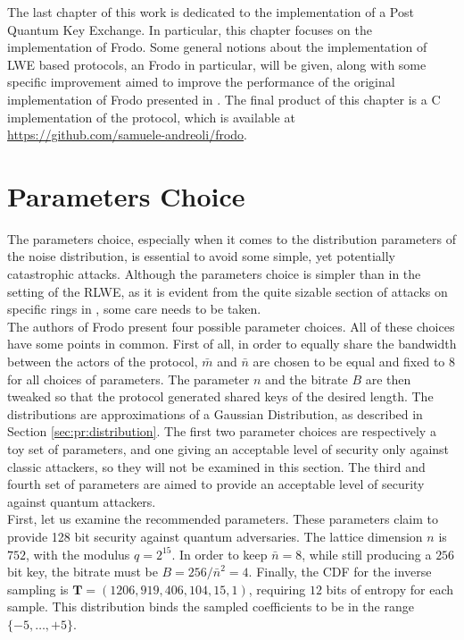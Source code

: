 The last chapter of this work is dedicated to the implementation of a Post Quantum Key Exchange. In particular, this chapter focuses on the implementation of Frodo. Some general notions about the implementation of LWE based protocols, an Frodo in particular, will be given, along with some specific improvement aimed to improve the performance of the original implementation of Frodo presented in \cite{frodo}. The final product of this chapter is a C implementation of the protocol, which is available at \url{https://github.com/samuele-andreoli/frodo}.

\section{Parameters Choice}
The parameters choice, especially when it comes to the distribution parameters of the noise distribution, is essential to avoid some simple, yet potentially catastrophic attacks. Although the parameters choice is simpler than in the setting of the RLWE, as it is evident from the quite sizable section of attacks on specific rings in \cite{RLWE_attacks}, some care needs to be taken.\\
The authors of Frodo present four possible parameter choices. All of these choices have some points in common. First of all, in order to equally share the bandwidth between the actors of the protocol, $\bar{m}$ and $\bar{n}$ are chosen to be equal and fixed to $8$ for all choices of parameters. The parameter $n$ and the bitrate $B$ are then tweaked so that the protocol generated shared keys of the desired length. The distributions are approximations of a Gaussian Distribution, as described in Section \ref{sec:pr:distribution}. The first two parameter choices are respectively a toy set of parameters, and one giving an acceptable level of security only against classic attackers, so they will not be examined in this section. The third and fourth set of parameters are aimed to provide an acceptable level of security against quantum attackers.\\
First, let us examine the recommended parameters. These parameters claim to provide 128 bit  security against quantum adversaries. The lattice dimension $n$ is $752$, with the modulus $q=2^{15}$. In order to keep $\bar{n}=8$, while still producing a $256$ bit key, the bitrate must be $B=256/\bar{n}^2=4$. Finally, the CDF for the inverse sampling is $\mathbf{T}=(1206, 919, 406, 104, 15, 1)$, requiring $12$ bits of entropy for each sample. This distribution binds the sampled coefficients to be in the range $\{-5,\ldots,+5\}$.\\
